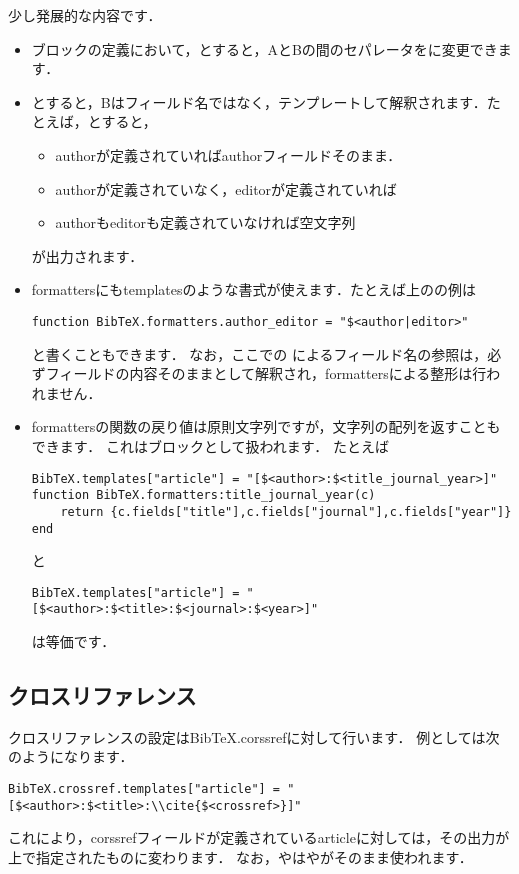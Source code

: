 \documentclass[a4paper]{ltjsarticle}
\begin{document}
少し発展的な内容です．
\begin{itemize}
\item ブロックの定義において，\luastring{[A:@S<sep>B:C]}とすると，AとBの間のセパレータをに変更できます．
\item {}とすると，Bはフィールド名ではなく，テンプレートして解釈されます．たとえば，とすると，
\begin{itemize}
\item authorが定義されていればauthorフィールドそのまま．
\item authorが定義されていなく，editorが定義されていれば
\item authorもeditorも定義されていなければ空文字列
\end{itemize}
が出力されます．
\item formattersにもtemplatesのような書式が使えます．たとえば上のの例は
\begin{lstlisting}
function BibTeX.formatters.author_editor = "$<author|editor>"
\end{lstlisting}
と書くこともできます．
なお，ここでの%
によるフィールド名の参照は，必ずフィールドの内容そのままとして解釈され，formattersによる整形は行われません．
\item formattersの関数の戻り値は原則文字列ですが，文字列の配列を返すこともできます．
これはブロックとして扱われます．
たとえば
\begin{lstlisting}
BibTeX.templates["article"] = "[$<author>:$<title_journal_year>]"
function BibTeX.formatters:title_journal_year(c)
    return {c.fields["title"],c.fields["journal"],c.fields["year"]}
end
\end{lstlisting}
と
\begin{lstlisting}
BibTeX.templates["article"] = "[$<author>:$<title>:$<journal>:$<year>]"
\end{lstlisting}
は等価です．
\end{itemize}

\subsection{クロスリファレンス}
クロスリファレンスの設定はBibTeX.corssrefに対して行います．
例としては次のようになります．
\begin{lstlisting}
BibTeX.crossref.templates["article"] = "[$<author>:$<title>:\\cite{$<crossref>}]"
\end{lstlisting}
これにより，corssrefフィールドが定義されているarticleに対しては，その出力が上で指定されたものに変わります．
なお，やはやがそのまま使われます．
\end{document}
